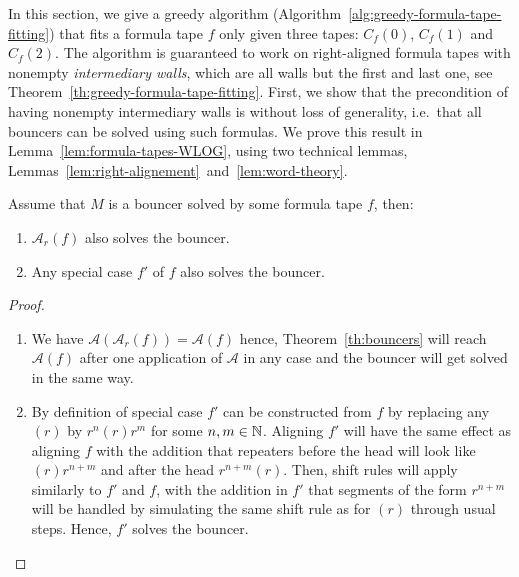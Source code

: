 In this section, we give a greedy algorithm (Algorithm~\ref{alg:greedy-formula-tape-fitting}) that fits a formula tape $f$ only given three tapes: $C_f(0)$, $C_f(1)$ and $C_f(2)$. The algorithm is guaranteed to work on right-aligned formula tapes with nonempty \textit{intermediary walls}, which are all walls but the first and last one, see Theorem~\ref{th:greedy-formula-tape-fitting}. First, we show that the precondition of having nonempty intermediary walls is without loss of generality, i.e.\ that all bouncers can be solved using such formulas. We prove this result in Lemma~\ref{lem:formula-tapes-WLOG}, using two technical lemmas, Lemmas~\ref{lem:right-alignement}~and~\ref{lem:word-theory}.



\begin{lemma}\label{lem:right-alignement}
    Assume that $M$ is a bouncer solved by some formula tape $f$, then:
    \begin{enumerate}
        \item $\mathcal{A}_r(f)$ also solves the bouncer.
        \item Any special case $f'$ of $f$ also solves the bouncer.

    \end{enumerate}
\end{lemma}
\begin{proof}

    \begin{enumerate}
        \item We have $\mathcal{A}(\mathcal{A}_r(f)) = \mathcal{A}(f)$ hence, Theorem~\ref{th:bouncers} will reach $\mathcal{A}(f)$ after one application of $\mathcal{A}$ in any case and the bouncer will get solved in the same way.
        \item By definition of special case $f'$ can be constructed from $f$ by replacing any $(r)$ by $r^n(r)r^m$ for some $n,m\in\mathbb{N}$. Aligning $f'$ will have the same effect as aligning $f$ with the addition that repeaters before the head will look like $(r)r^{n+m}$  and after the head $r^{n+m}(r)$. Then, shift rules will apply similarly to $f'$ and $f$, with the addition in $f'$ that segments of the form $r^{n+m}$ will be handled by simulating the same shift rule as for $(r)$ through usual steps. Hence, $f'$ solves the bouncer.
    \end{enumerate}

\end{proof}

